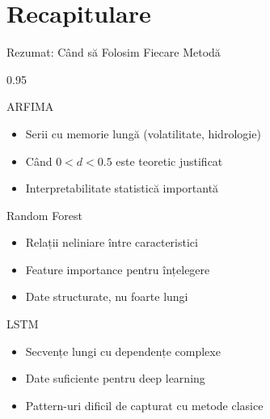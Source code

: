 \documentclass[9pt, aspectratio=169, t]{beamer}
\begin{document}
\section{Recapitulare}

\begin{frame}{Rezumat: Când să Folosim Fiecare Metodă}
    \begin{cminipage}{0.95\textwidth}
    \vspace{-3mm}
    {\footnotesize
    \begin{block}{ARFIMA}
        \begin{itemize}\setlength{\itemsep}{0pt}\parsep=0pt
            \item Serii cu memorie lungă (volatilitate, hidrologie)
            \item Când $0 < d < 0.5$ este teoretic justificat
            \item Interpretabilitate statistică importantă
        \end{itemize}
    \end{block}
    \vspace{-1mm}
    \begin{block}{Random Forest}
        \begin{itemize}\setlength{\itemsep}{0pt}\parsep=0pt
            \item Relații neliniare între caracteristici
            \item Feature importance pentru înțelegere
            \item Date structurate, nu foarte lungi
        \end{itemize}
    \end{block}
    \vspace{-1mm}
    \begin{block}{LSTM}
        \begin{itemize}\setlength{\itemsep}{0pt}\parsep=0pt
            \item Secvențe lungi cu dependențe complexe
            \item Date suficiente pentru deep learning
            \item Pattern-uri dificil de capturat cu metode clasice
        \end{itemize}
    \end{block}
    }
    \end{cminipage}
\end{frame}
\end{document}
